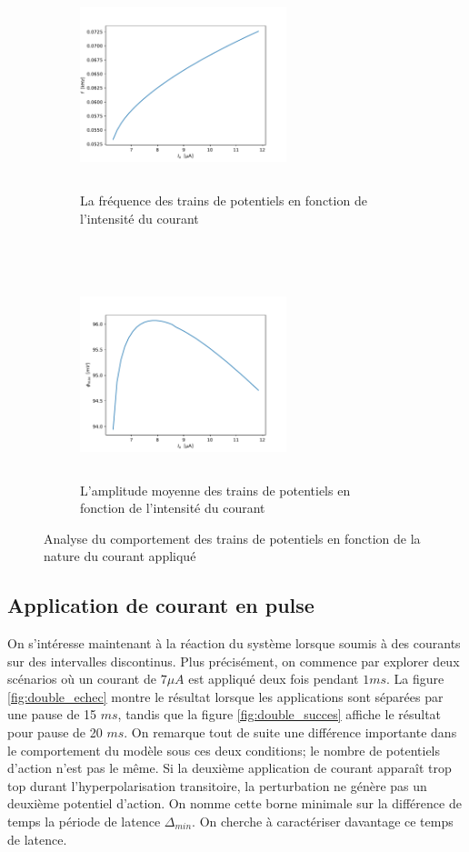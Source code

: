 \documentclass{article}
\begin{document}
\begin{figure}[H]
	\begin{subfigure}{0.5\linewidth}
	\includegraphics[width=6cm, height=6cm]{Frequency.pdf}
	\centering
	\caption{La fréquence des trains de potentiels en fonction de l'intensité du courant}
	\label{fig:frequence}
	\end{subfigure}
	~
	\begin{subfigure}{0.5\linewidth}
	\includegraphics[width=6cm, height=6cm]{Amplitude.pdf}
	\centering
	\caption{L'amplitude moyenne des trains de potentiels en fonction de l'intensité du courant}
	\label{fig:amplitude}
	\end{subfigure}
	\caption{Analyse du comportement des trains de potentiels en fonction de la nature du courant appliqué}
	\label{fig:frequence_amplitude}
\end{figure}


\subsection{Application de courant en pulse}\label{sec:periode_latence}

On s'intéresse maintenant à la réaction du système lorsque soumis à des courants sur des intervalles discontinus. Plus précisément, on commence par explorer deux scénarios où un courant de  $7 \mu A$ est appliqué deux fois pendant $1ms$. La figure \ref{fig:double_echec} montre le résultat lorsque les applications sont séparées par une pause de 15 $ms$, tandis que la figure \ref{fig:double_succes} affiche le résultat pour pause de 20 $ms$. On remarque tout de suite une différence importante dans le comportement du modèle sous ces deux conditions; le nombre de potentiels d'action n'est pas le même. Si la deuxième application de courant apparaît trop top durant l'hyperpolarisation transitoire, la perturbation ne génère pas un deuxième potentiel d'action. On nomme cette borne minimale sur la différence de temps la période de latence $\Delta_{min}$. On cherche à caractériser davantage ce temps de latence.
\end{document}
